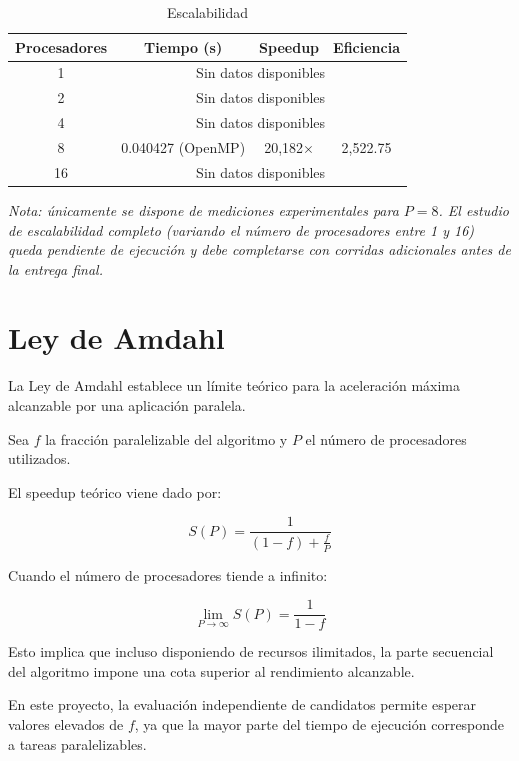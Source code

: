 \begin{table}[H]
\centering
\caption{Escalabilidad}
\begin{tabular}{cccc}
\toprule
Procesadores & Tiempo (s) & Speedup & Eficiencia \\
\midrule
1  & \multicolumn{3}{c}{Sin datos disponibles} \\
2  & \multicolumn{3}{c}{Sin datos disponibles} \\
4  & \multicolumn{3}{c}{Sin datos disponibles} \\
8  & 0.040427 (OpenMP) & 20{,}182$\times$ & 2{,}522.75 \\
16 & \multicolumn{3}{c}{Sin datos disponibles} \\
\bottomrule
\end{tabular}
\end{table}

\textit{Nota: únicamente se dispone de mediciones experimentales para $P=8$. El estudio de escalabilidad completo (variando el número de procesadores entre 1 y 16) queda pendiente de ejecución y debe completarse con corridas adicionales antes de la entrega final.}

\section{Ley de Amdahl}

La Ley de Amdahl establece un límite teórico para la aceleración máxima alcanzable por una aplicación paralela.

Sea \(f\) la fracción paralelizable del algoritmo y \(P\) el número de procesadores utilizados.

El speedup teórico viene dado por:

\begin{equation}
S(P)=
\frac{1}
     {(1-f)+\frac{f}{P}}
\end{equation}

Cuando el número de procesadores tiende a infinito:

\[
\lim_{P\to\infty}S(P)
=
\frac{1}{1-f}
\]

Esto implica que incluso disponiendo de recursos ilimitados, la parte secuencial del algoritmo impone una cota superior al rendimiento alcanzable.

En este proyecto, la evaluación independiente de candidatos permite esperar valores elevados de \(f\), ya que la mayor parte del tiempo de ejecución corresponde a tareas paralelizables.

